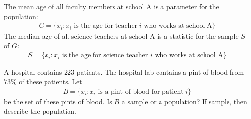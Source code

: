 \begin{example}
The mean age of all faculty members at school A is a parameter for the population:
\begin{align*}
    G = \{x_{i}: x_{i} \hspace{4pt} \text{is the age for teacher} \hspace{4pt} i \hspace{4pt} \text{who works at school A}\}
\end{align*}
The median age of all science teachers at school A is a statistic for the sample $S$ of $G$:
\begin{align*}
    S = \{x_{i}: x_{i} \hspace{4pt} \text{is the age for science teacher} \hspace{4pt} i \hspace{4pt} \text{who works at school A}\}
\end{align*}
\end{example}

\begin{exercise}
A hospital contains $223$ patients. The hospital lab contains a pint of blood from $73\%$ of these patients. Let
\begin{align*}
    B = \{x_{i}: x_{i} \hspace{4pt} \text{is a pint of blood for patient} \hspace{4pt} i\}
\end{align*}
be the set of these pints of blood. Is $B$ a sample or a population? If sample, then describe the population.
\end{exercise}

\begin{exercise}
\end{exercise}